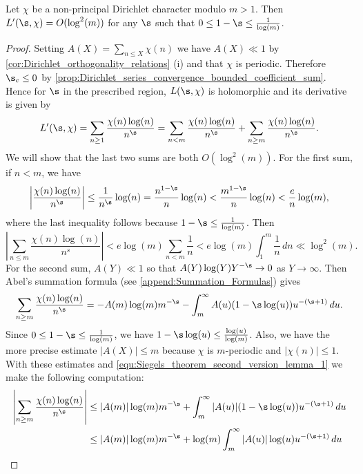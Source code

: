       \begin{lemma}\label{lem:Siegels_theorem_second_version_lemma}
        Let $\chi$ be a non-principal Dirichlet character modulo $m > 1$. Then $L'(\s,\chi) = O(\log^{2}(m))$ for any $\s$ such that $0 \le 1-\s \le \frac{1}{\log(m)}$.
      \end{lemma}
      \begin{proof}
        Setting $A(X) = \sum_{n \le X}\chi(n)$ we have $A(X) \ll 1$ by \cref{cor:Dirichlet_orthogonality_relations} (i) and that $\chi$ is periodic. Therefore $\s_{c} \le 0$ by \cref{prop:Dirichlet_series_convergence_bounded_coefficient_sum}. Hence for $\s$ in the prescribed region, $L(\s,\chi)$ is holomorphic and its derivative is given by
        \[
          L'(\s,\chi) = \sum_{n \ge 1}\frac{\chi(n)\log(n)}{n^{\s}} = \sum_{n < m}\frac{\chi(n)\log(n)}{n^{\s}}+\sum_{n \ge m}\frac{\chi(n)\log(n)}{n^{\s}}.
        \]
        We will show that the last two sums are both $O(\log^{2}(m))$. For the first sum, if $n < m$, we have
        \[
          \left|\frac{\chi(n)\log(n)}{n^{\s}}\right| \le \frac{1}{n^{\s}}\log(n) = \frac{n^{1-\s}}{n}\log(n) < \frac{m^{1-\s}}{n}\log(n) < \frac{e}{n}\log(m),
        \]
        where the last inequality follows because $1-\s \le \frac{1}{\log(m)}$. Then
        \[
          \left|\sum_{n \le m}\frac{\chi(n)\log(n)}{n^{s}}\right| < e\log(m)\sum_{n < m}\frac{1}{n} < e\log(m)\int_{1}^{m}\frac{1}{n}\,dn \ll \log^{2}(m).
        \]
        For the second sum, $A(Y) \ll 1$ so that $A(Y)\log(Y)Y^{-\s} \to 0$ as $Y \to \infty$. Then Abel's summation formula (see \cref{append:Summation_Formulas}) gives
        \begin{equation}\label{equ:Siegels_theorem_second_version_lemma_1}
          \sum_{n \ge m}\frac{\chi(n)\log(n)}{n^{\s}} = -A(m)\log(m)m^{-\s}-\int_{m}^{\infty}A(u)(1-\s\log(u))u^{-(\s+1)}\,du.
        \end{equation}
        Since $0 \le 1-\s \le \frac{1}{\log(m)}$, we have $1-\s\log(u) \le \frac{\log(u)}{\log(m)}$. Also, we have the more precise estimate $|A(X)| \le m$ because $\chi$ is $m$-periodic and $|\chi(n)| \le 1$. With these estimates and \cref{equ:Siegels_theorem_second_version_lemma_1} we make the following computation:
        \begin{align*}
          \left|\sum_{n \ge m}\frac{\chi(n)\log(n)}{n^{\s}}\right| &\le |A(m)|\log(m)m^{-\s}+\int_{m}^{\infty}|A(u)|(1-\s\log(u))u^{-(\s+1)}\,du \\
          &\le |A(m)|\log(m)m^{-\s}+\log(m)\int_{m}^{\infty}|A(u)|\log(u)u^{-(\s+1)}\,du \\

\end{align*}
\end{proof}
